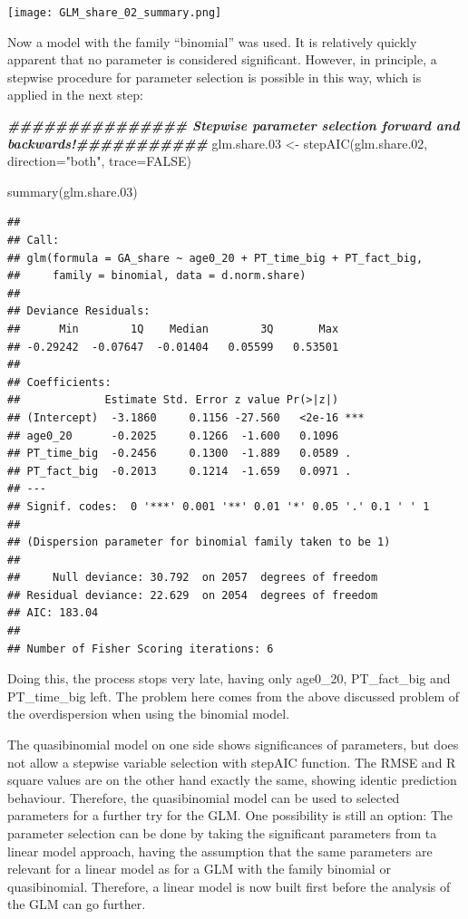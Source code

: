 \documentclass[
]{article}
\newenvironment{Shaded}{\begin{snugshade}}{\end{snugshade}}
\newcommand{\AttributeTok}[1]{\textcolor[rgb]{0.77,0.63,0.00}{#1}}
\newcommand{\ConstantTok}[1]{\textcolor[rgb]{0.00,0.00,0.00}{#1}}
\newcommand{\DocumentationTok}[1]{\textcolor[rgb]{0.56,0.35,0.01}{\textbf{\textit{#1}}}}
\newcommand{\FloatTok}[1]{\textcolor[rgb]{0.00,0.00,0.81}{#1}}
\newcommand{\FunctionTok}[1]{\textcolor[rgb]{0.00,0.00,0.00}{#1}}
\newcommand{\NormalTok}[1]{#1}
\newcommand{\OtherTok}[1]{\textcolor[rgb]{0.56,0.35,0.01}{#1}}
\newcommand{\StringTok}[1]{\textcolor[rgb]{0.31,0.60,0.02}{#1}}
\begin{document}
\texttt{[image: GLM\_share\_02\_summary.png]}

Now a model with the family ``binomial'' was used. It is relatively
quickly apparent that no parameter is considered significant. However,
in principle, a stepwise procedure for parameter selection is possible
in this way, which is applied in the next step:

\begin{Shaded}
\begin{Highlighting}[]
\DocumentationTok{\#\#\#\#\#\#\#\#\#\#\#\#\#\#\# Stepwise parameter selection forward and backwards!\#\#\#\#\#\#\#\#\#\#\#}
\NormalTok{glm.share}\FloatTok{.03} \OtherTok{\textless{}{-}} \FunctionTok{stepAIC}\NormalTok{(glm.share}\FloatTok{.02}\NormalTok{, }\AttributeTok{direction=}\StringTok{"both"}\NormalTok{, }\AttributeTok{trace=}\ConstantTok{FALSE}\NormalTok{)}

\FunctionTok{summary}\NormalTok{(glm.share}\FloatTok{.03}\NormalTok{)}
\end{Highlighting}
\end{Shaded}

\begin{verbatim}
## 
## Call:
## glm(formula = GA_share ~ age0_20 + PT_time_big + PT_fact_big, 
##     family = binomial, data = d.norm.share)
## 
## Deviance Residuals: 
##      Min        1Q    Median        3Q       Max  
## -0.29242  -0.07647  -0.01404   0.05599   0.53501  
## 
## Coefficients:
##             Estimate Std. Error z value Pr(>|z|)    
## (Intercept)  -3.1860     0.1156 -27.560   <2e-16 ***
## age0_20      -0.2025     0.1266  -1.600   0.1096    
## PT_time_big  -0.2456     0.1300  -1.889   0.0589 .  
## PT_fact_big  -0.2013     0.1214  -1.659   0.0971 .  
## ---
## Signif. codes:  0 '***' 0.001 '**' 0.01 '*' 0.05 '.' 0.1 ' ' 1
## 
## (Dispersion parameter for binomial family taken to be 1)
## 
##     Null deviance: 30.792  on 2057  degrees of freedom
## Residual deviance: 22.629  on 2054  degrees of freedom
## AIC: 183.04
## 
## Number of Fisher Scoring iterations: 6
\end{verbatim}

Doing this, the process stops very late, having only age0\_20,
PT\_fact\_big and PT\_time\_big left. The problem here comes from the
above discussed problem of the overdispersion when using the binomial
model.

The quasibinomial model on one side shows significances of parameters,
but does not allow a stepwise variable selection with stepAIC function.
The RMSE and R square values are on the other hand exactly the same,
showing identic prediction behaviour. Therefore, the quasibinomial model
can be used to selected parameters for a further try for the GLM. One
possibility is still an option: The parameter selection can be done by
taking the significant parameters from ta linear model approach, having
the assumption that the same parameters are relevant for a linear model
as for a GLM with the family binomial or quasibinomial. Therefore, a
linear model is now built first before the analysis of the GLM can go
further.
\end{document}
